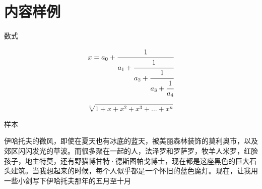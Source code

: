 \section{内容样例}

\begin{frame}{数式}

  \begin{equation}
    x = a_0 + \cfrac{1}{a_1 
      + \cfrac{1}{a_2 
        + \cfrac{1}{a_3 + \cfrac{1}{a_4} } } }
  \end{equation}

  \[
  \sqrt[n]{1+x+x^2+x^3+\dots+x^n}
  \]

\end{frame}

\begin{frame}{样本}

  伊哈托夫的微风，即使在夏天也有冰底的蓝天，被美丽森林装饰的莫利奥市，以及郊区闪闪发光的草波。而很多聚在一起的人，法泽罗和罗萨罗，牧羊人米罗，红脸孩子，地主特莫，还有野猫博甘特·德斯图帕戈博士，现在都是这座黑色的巨大石头建筑。当我想起来的时候，每个人似乎都是一个怀旧的蓝色魔灯。现在，让我用一些小剑写下伊哈托夫那年的五月至十月
  
\end{frame}
